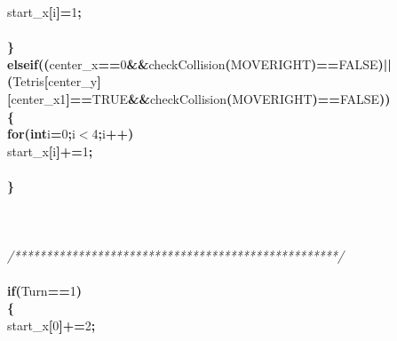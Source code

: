 \documentclass[a4paper, 10pt]{article}
\newcommand\SPC{\hspace*{0.6em}}
\newcommand\HYP{\mbox{\char 45}}
\newcommand{\CppAComment}[1]{\textit{\textcolor[rgb]{0.2,0.6,1}{#1}}}
\newcommand{\CppAIdentifier}[1]{#1}
\newcommand{\CppANumber}[1]{\textcolor[rgb]{0.5,0,0.5}{#1}}
\newcommand{\CppAReservedWord}[1]{\textbf{#1}}
\newcommand{\CppASpace}[1]{\colorbox[rgb]{1,1,1}{#1}}
\newcommand{\CppASymbol}[1]{\textbf{\textcolor[rgb]{1,0,0}{#1}}}
\begin{document}
\begin{ttfamily}
\CppASpace{\SPC \SPC \SPC \SPC \SPC \SPC }\CppAIdentifier{start\_x}\CppASymbol{[}\CppAIdentifier{i}\CppASymbol{]}\CppASymbol{\HYP =}\CppANumber{1}\CppASymbol{;}\\
\\
\CppASpace{\SPC \SPC \SPC \SPC }\CppASymbol{\}}\\
\CppASpace{\SPC \SPC \SPC \SPC }\CppAReservedWord{else}\CppASpace{\SPC }\CppAReservedWord{if}\CppASymbol{(}\CppASymbol{(}\CppAIdentifier{center\_x}\CppASymbol{==}\CppANumber{0}\CppASpace{\SPC }\CppASymbol{\&\&}\CppASpace{\SPC }\CppAIdentifier{checkCollision}\CppASymbol{(}\CppAIdentifier{MOVERIGHT}\CppASymbol{)}\CppASymbol{==}\CppAIdentifier{FALSE}\CppASymbol{)}\CppASpace{\SPC }\CppASymbol{||}\CppASpace{\SPC }\CppASymbol{(}\CppAIdentifier{Tetris}\CppASymbol{[}\CppAIdentifier{center\_y}\CppASymbol{]}\CppASymbol{[}\CppAIdentifier{center\_x}\CppASymbol{\HYP }\CppANumber{1}\CppASymbol{]}\CppASymbol{==}\CppAIdentifier{TRUE}\CppASymbol{\&\&}\CppAIdentifier{checkCollision}\CppASymbol{(}\CppAIdentifier{MOVERIGHT}\CppASymbol{)}\CppASymbol{==}\CppAIdentifier{FALSE}\CppASymbol{)}\CppASymbol{)}\\
\CppASpace{\SPC \SPC \SPC \SPC }\CppASymbol{\{}\\
\CppASpace{\SPC \SPC \SPC \SPC \SPC }\CppAReservedWord{for}\CppASymbol{(}\CppAReservedWord{int}\CppASpace{\SPC }\CppAIdentifier{i}\CppASymbol{=}\CppANumber{0}\CppASymbol{;}\CppAIdentifier{i}\CppASymbol{$<$}\CppANumber{4}\CppASymbol{;}\CppAIdentifier{i}\CppASymbol{++}\CppASymbol{)}\\
\CppASpace{\SPC \SPC \SPC \SPC \SPC \SPC }\CppAIdentifier{start\_x}\CppASymbol{[}\CppAIdentifier{i}\CppASymbol{]}\CppASymbol{+=}\CppANumber{1}\CppASymbol{;}\\
\\
\CppASpace{\SPC \SPC \SPC \SPC }\CppASymbol{\}}\\
\\
\\
\\
\CppASpace{\SPC \SPC \SPC }\CppAComment{/***************************************************/}\\
\\
\CppASpace{\SPC \SPC \SPC \SPC }\CppAReservedWord{if}\CppASymbol{(}\CppAIdentifier{Turn}\CppASymbol{==}\CppANumber{1}\CppASymbol{)}\\
\CppASpace{\SPC \SPC \SPC \SPC }\CppASymbol{\{}\\
\CppASpace{\SPC \SPC \SPC \SPC \SPC }\CppAIdentifier{start\_x}\CppASymbol{[}\CppANumber{0}\CppASymbol{]}\CppASymbol{+=}\CppANumber{2}\CppASymbol{;}\\

\end{ttfamily}
\end{document}
